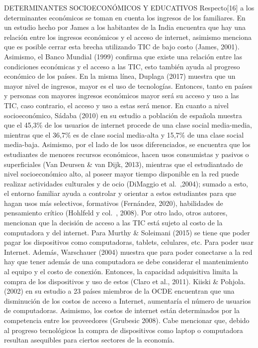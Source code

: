 \begin{enumerate}
  DETERMINANTES SOCIOECONÓMICOS Y EDUCATIVOS Respecto{[}16{]} a los
  determinantes económicos se toman en cuenta los ingresos de los
  familiares. En un estudio hecho por James a los habitantes de la India
  encuentra que hay una relación entre los ingresos económicos y el
  acceso de internet, asimismo menciona que es posible cerrar esta
  brecha utilizando TIC de bajo costo (James, 2001). Asimismo, el Banco
  Mundial (1999) confirma que existe una relación entre las condiciones
  económicas y el acceso a las TIC, esto también ayuda al progreso
  económico de los países. En la misma línea, Duplaga (2017) muestra que
  un mayor nivel de ingresos, mayor es el uso de tecnologías. Entonces,
  tanto en países y personas con mayores ingresos económicos mayor será
  su acceso y uso a las TIC, caso contrario, el acceso y uso a estas
  será menor. En cuanto a nivel socioeconómico, Sádaba (2010) en su
  estudio a población de española muestra que el 45,3\% de los usuarios
  de internet procede de una clase social media-media, mientras que el
  36,7\% es de clase social media-alta y 15,7\% de una clase social
  media-baja. Asimismo, por el lado de los usos diferenciados, se
  encuentra que los estudiantes de menores recursos económicos, hacen
  usos consumistas y pasivos o superficiales (Van Deursen \& van Dijk,
  2013), mientras que el estudiantado de nivel socioeconómico alto, al
  poseer mayor tiempo disponible en la red puede realizar actividades
  culturales y de ocio (DiMaggio et al.~,2004); sumado a esto, el
  entorno familiar ayuda a controlar y orientar a estos estudiantes para
  que hagan usos más selectivos, formativos (Fernández, 2020),
  habilidades de pensamiento crítico (Hohlfeld y col.~, 2008). Por otro
  lado, otros autores, mencionan que la decisión de acceso a las TIC
  está sujeto al costo de la computadora y del internet. Para Murthy \&
  Soleimani (2015) se tiene que poder pagar los dispositivos como
  computadoras, tablets, celulares, etc. Para poder usar Internet.
  Además, Warschauer (2004) muestra que para poder conectarse a la red
  hay que tener además de una computadora se debe considerar el
  mantenimiento al equipo y el costo de conexión. Entonces, la capacidad
  adquisitiva limita la compra de los dispositivos y uso de estos (Claro
  et al., 2011). Kiiski \& Pohjola. (2002) en su estudio a 23 países
  miembros de la OCDE encuentran que una disminución de los costos de
  acceso a Internet, aumentaría el número de usuarios de computadoras.
  Asimismo, los costos de internet están determinados por la competencia
  entre los proveedores (Grubesic 2008). Cabe mencionar que, debido al
  progreso tecnológicos la compra de dispositivos como laptop o
  computadora resultan asequibles para ciertos sectores de la economía.
\end{enumerate}

